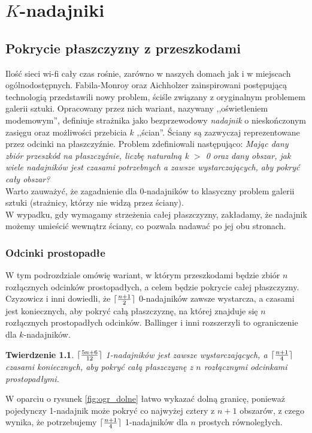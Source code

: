 \documentclass[brudnopis]{xmgr}
\DeclarePairedDelimiter\ceil{\lceil}{\rceil}
\newtheorem{Twierdzenie}{Twierdzenie}
\theoremstyle{definition}
\begin{document}
\chapter{$K$-nadajniki}

\section{Pokrycie płaszczyzny z przeszkodami}\label{sec:knadajniki}
	Ilość sieci wi-fi cały czas rośnie, zarówno w naszych domach jak i w miejscach ogólnodostępnych. Fabila-Monroy oraz Aichholzer \cite{fabilamonroy} zainspirowani postępującą technologią przedstawili nowy problem, ściśle związany z oryginalnym problemem galerii sztuki. Opracowany przez nich wariant, nazywany ,,oświetleniem modemowym'', definiuje strażnika jako bezprzewodowy \emph{nadajnik} o nieskończonym zasięgu oraz możliwości przebicia $k$ ,,ścian''. Ściany są zazwyczaj reprezentowane przez odcinki na płaszczyźnie. Problem zdefiniowali następująco: \emph{Mając dany zbiór przeszkód na płaszczyźnie, liczbę naturalną k $>$ 0 oraz dany obszar, jak wiele nadajników jest czasami potrzebnych a zawsze wystarczających, aby pokryć cały obszar?}  
\\\indent Warto zauważyć, że zagadnienie dla 0-nadajników to klasyczny problem galerii sztuki (strażnicy, którzy nie widzą przez ściany).
\\\indent W wypadku, gdy wymagamy strzeżenia całej płaszczyzny, zakładamy, że nadajnik możemy umieścić wewnątrz ściany, co pozwala nadawać po jej obu stronach.
\subsection{Odcinki prostopadłe}
W tym podrozdziale omówię wariant, w którym przeszkodami będzie zbiór $n$ rozłącznych odcinków prostopadłych, a celem będzie pokrycie całej płaszczyzny. Czyzowicz i inni \cite{czyzowicz} dowiedli, że $\ceil{\frac{n+1}{2}}$ 0-nadajników zawsze wystarcza, a czasami jest koniecznych, aby pokryć całą płaszczyznę, na której znajduje się $n$ rozłącznych prostopadłych odcinków. Ballinger i inni \cite{knadajniki} rozszerzyli to ograniczenie dla $k$-nadajników.

\begin{Twierdzenie} \label{ograniczenie zbiór odcinków prostopadłych} \cite{knadajniki}
  $\ceil{\frac{5n+6}{12}}$ 1-nadajników jest zawsze wystarczających, a $\ceil{\frac{n+1}{4}}$ czasami koniecznych, aby pokryć całą płaszczyznę z $n$ rozłącznymi odcinkami prostopadłymi.
\end{Twierdzenie}
\indent W oparciu o rysunek \ref{fig:ogr_dolne} łatwo wykazać dolną granicę, ponieważ pojedynczy 1-nadajnik może pokryć co najwyżej cztery z $n + 1$ obszarów, z czego wynika, że potrzebujemy $\ceil{\frac{n+1}{4}}$ 1-nadajników dla $n$ prostych równoległych.
\end{document}

